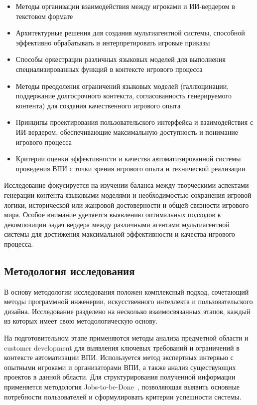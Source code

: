 \begin{itemize}
    \item Методы организации взаимодействия между игроками и ИИ-вердером в текстовом формате

    \item Архитектурные решения для создания мультиагентной системы, способной эффективно обрабатывать и интерпретировать игровые приказы

    \item Способы оркестрации различных языковых моделей для выполнения специализированных функций в контексте игрового процесса

    \item Методы преодоления ограничений языковых моделей (галлюцинации, поддержание долгосрочного контекста, согласованность генерируемого контента) для создания качественного игрового опыта

    \item Принципы проектирования пользовательского интерфейса и взаимодействия с ИИ-вердером, обеспечивающие максимальную доступность и понимание игрового процесса

    \item Критерии оценки эффективности и качества автоматизированной системы проведения ВПИ с точки зрения игрового опыта и технической реализации
\end{itemize}

Исследование фокусируется на изучении баланса между творческими аспектами генерации контента языковыми моделями и необходимостью сохранения игровой логики, исторической или жанровой достоверности и общей связности игрового мира. Особое внимание уделяется выявлению оптимальных подходов к декомпозиции задач вердера между различными агентами мультиагентной системы для достижения максимальной эффективности и качества игрового процесса.

\subsection{Методология исследования}

В основу методологии исследования положен комплексный подход, сочетающий методы программной инженерии, искусственного интеллекта и пользовательского дизайна. Исследование разделено на несколько взаимосвязанных этапов, каждый из которых имеет свою методологическую основу.

На подготовительном этапе применяются методы анализа предметной области и customer development для выявления ключевых требований и ограничений в контексте автоматизации ВПИ. Используется метод экспертных интервью с опытными игроками и организаторами ВПИ, а также анализ существующих проектов в данной области. Для структурирования полученной информации применяется методология Jobs-to-be-Done~\cite{christensen2016knowing}, позволяющая выявить основные потребности пользователей и сформулировать критерии успешности системы.

